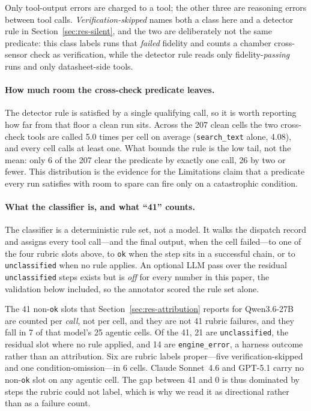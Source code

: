 \documentclass[11pt]{article}
\begin{document}
Only tool-output errors are charged to a tool; the other three are
reasoning errors between tool calls. \emph{Verification-skipped} names
both a class here and a detector rule in
Section~\ref{sec:res-silent}, and the two are deliberately not the same
predicate: this class labels runs that \emph{failed} fidelity and counts
a chamber cross-sensor check as verification, while the detector rule
reads only fidelity-\emph{passing} runs and only datasheet-side tools.

\paragraph{How much room the cross-check predicate leaves.}
The detector rule is satisfied by a single qualifying call, so it is
worth reporting how far from that floor a clean run sits. Across the 207
clean cells the two cross-check tools are called 5.0 times per cell on
average (\texttt{search\_text} alone, 4.08), and every cell calls at
least one. What bounds the rule is the low tail, not the mean: only 6
of the 207 clear the predicate by exactly one call, 26 by two or fewer.
This distribution is the evidence for the Limitations claim that a
predicate every run satisfies with room to spare can fire only on a
catastrophic condition.

\paragraph{What the classifier is, and what ``41'' counts.}
The classifier is a deterministic rule set, not a model. It walks the
dispatch record and assigns every tool call---and the final output, when
the cell failed---to one of the four rubric slots above, to \texttt{ok}
when the step sits in a successful chain, or to \texttt{unclassified}
when no rule applies. An optional LLM pass over the residual
\texttt{unclassified} steps exists but is \emph{off} for every number
in this paper, the validation below included, so the annotator scored
the rule set alone.

The 41 non-\texttt{ok} slots that Section~\ref{sec:res-attribution}
reports for Qwen3.6-27B are counted per \emph{call}, not per cell, and
they are not 41 rubric failures, and they fall in 7 of that model's 25
agentic cells. Of the 41, 21 are \texttt{unclassified}, the residual
slot where no rule applied, and 14 are \texttt{engine\_error}, a
harness outcome rather than an attribution. Six are rubric labels
proper---five verification-skipped and one condition-omission---in 6
cells.
Claude Sonnet~4.6 and GPT-5.1 carry no non-\texttt{ok} slot on any
agentic cell. The gap between 41 and 0 is thus dominated by steps the
rubric could not label, which is why we read it as directional rather
than as a failure count.
\end{document}
